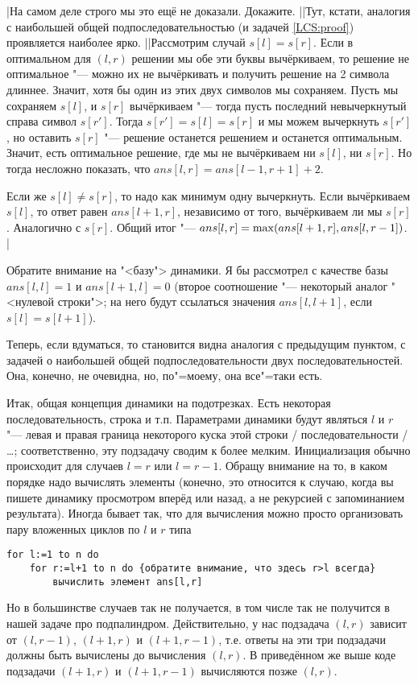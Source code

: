 \task|На самом деле строго мы это ещё не доказали. Докажите.
||Тут, кстати, аналогия с наибольшей общей подпоследовательностью (и задачей \ref{LCS:proof}) проявляется наиболее ярко.
||Рассмотрим случай $s[l]=s[r]$. Если в оптимальном для $(l,r)$ решении мы обе эти буквы 
вычёркиваем, то решение не оптимальное "--- можно их не вычёркивать и получить решение на 2 символа 
длиннее. Значит, хотя бы один из этих двух символов мы сохраняем. Пусть мы сохраняем $s[l]$, и 
$s[r]$ вычёркиваем "--- тогда пусть последний невычеркнутый справа символ $s[r']$. Тогда $s[r']=s[l]=s[r]$ 
и мы можем вычеркнуть $s[r']$, но оставить $s[r]$ "--- решение останется решением и останется 
оптимальным. Значит, есть оптимальное решение, где мы не вычёркиваем ни $s[l]$, ни $s[r]$. Но тогда 
несложно показать, что $ans[l,r]=ans[l-1,r+1]+2$.

Если же $s[l]\neq s[r]$, то надо как минимум одну вычеркнуть. Если вычёркиваем $s[l]$, то ответ 
равен $ans[l+1,r]$, независимо от того, вычёркиваем ли мы $s[r]$. Аналогично с $s[r]$. Общий итог 
"--- $ans[l,r]\hm=\max(ans[l+1,r],ans[l,r-1])$.
|

Обратите внимание на "<базу"> динамики. Я бы рассмотрел с качестве базы $ans[l,l]=1$ и 
$ans[l+1,l]=0$ (второе соотношение "--- некоторый аналог "<нулевой строки">; на него будут 
ссылаться значения $ans[l,l+1]$, если $s[l]=s[l+1]$).

Теперь, если вдуматься, то становится видна аналогия с предыдущим пунктом, с задачей о наибольшей общей подпоследовательности двух последовательностей. Она, конечно, не очевидна, но, по"=моему, она все"=таки есть. 

Итак, общая концепция динамики на подотрезках. Есть некоторая последовательность, строка и т.п. Параметрами динамики будут являться $l$ и $r$ "--- левая и правая граница некоторого куска этой строки / последовательности / \dots{}; соответственно, эту подзадачу сводим к более мелким. Инициализация обычно происходит для случаев $l=r$ или $l=r-1$. Обращу внимание на то, в каком порядке надо вычислять элементы (конечно, это относится к случаю, когда вы пишете динамику просмотром вперёд или назад, а не рекурсией с запоминанием результата). Иногда бывает так, что для вычисления можно просто организовать пару вложенных циклов по $l$ и $r$ типа
\begin{codesampleo}\begin{verbatim}
for l:=1 to n do
    for r:=l+1 to n do {обратите внимание, что здесь r>l всегда}
        вычислить элемент ans[l,r]
\end{verbatim}\end{codesampleo}
Но в большинстве случаев так не получается, в том числе так не получится в нашей задаче про подпалиндром. Действительно, у нас подзадача $(l,r)$ зависит от $(l,r-1)$,  $(l+1,r)$ и $(l+1,r-1)$, т.е. ответы на эти три подзадачи должны быть вычислены до вычисления $(l,r)$. В приведённом же выше коде подзадачи $(l+1,r)$ и $(l+1,r-1)$ вычисляются позже $(l,r)$. 

